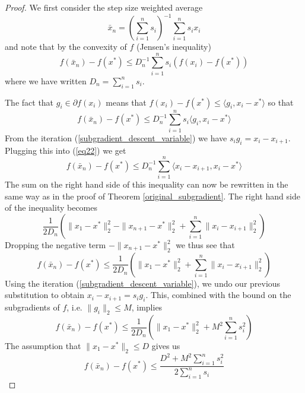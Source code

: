 \begin{proof}
 We first consider the step size weighted average
 $$\bar{x}_n = \left(\displaystyle\sum_{i = 1}^n s_i\right)^{-1} \displaystyle\sum_{i=1}^n s_ix_i
 $$
 and note that by the convexity of $f$ (Jensen's inequality)
 \begin{equation}
  f(\bar{x}_n) - f(x^*) \leq D_n^{-1} \displaystyle\sum_{i=1}^n s_i(f(x_i) - f(x^*))
 \end{equation}
 where we have written $D_n = \sum_{i = 1}^n s_i$.
 
 The fact that $g_i\in \partial f(x_i)$ means that $f(x_i) - f(x^*) \leq \langle g_i, x_i - x^*\rangle$ so that
 \begin{equation}\label{eq22}
  f(\bar{x}_n) - f(x^*) \leq D_n^{-1} \displaystyle\sum_{i=1}^n s_i\langle g_i, x_i - x^*\rangle
 \end{equation}
 From the iteration (\ref{subgradient_descent_variable}) we have $s_ig_i = x_i - x_{i+1}$. Plugging this into
 (\ref{eq22}) we get
 \begin{equation}
  f(\bar{x}_n) - f(x^*) \leq D_n^{-1} \displaystyle\sum_{i=1}^n \langle x_i - x_{i+1}, x_i - x^*\rangle
 \end{equation}
 The sum on the right hand side of this inequality can now be rewritten in the same way as in the proof of Theorem
 \ref{original_subgradient}. The right hand side of the inequality becomes
 \begin{equation}
  \frac{1}{2D_n}\left(\|x_1 - x^*\|_2^2 - \|x_{n+1} - x^*\|_2^2 + \displaystyle\sum_{i=1}^n\|x_i - x_{i+1}\|_2^2\right)
 \end{equation}
 Dropping the negative term $-\|x_{n+1} - x^*\|_2^2$ we thus see that
 \begin{equation}
  f(\bar{x}_n) - f(x^*) \leq \frac{1}{2D_n}\left(\|x_1 - x^*\|_2^2 + \displaystyle\sum_{i=1}^n\|x_i - x_{i+1}\|_2^2\right)
 \end{equation}
 Using the iteration (\ref{subgradient_descent_variable}), we undo our previous substitution to obtain
 $x_i - x_{i+1} = s_ig_i$. This, combined with the bound on the subgradients of $f$, i.e. $\|g_i\|_2 \leq M$, implies
 \begin{equation}
  f(\bar{x}_n) - f(x^*) \leq \frac{1}{2D_n}\left(\|x_1 - x^*\|_2^2 + M^2\displaystyle\sum_{i=1}^n s_i^2\right)
 \end{equation}
 The assumption that $\|x_1 - x^*\|_2 \leq D$ gives us
 \begin{equation}
  f(\bar{x}_n) - f(x^*) \leq \frac{D^2 + M^2\displaystyle\sum_{i=1}^n s_i^2}{2\displaystyle\sum_{i=1}^n s_i}

\end{equation}
\end{proof}
